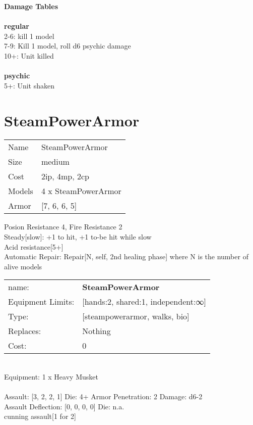 {\bf Damage Tables} \\
\ \\ {\bf regular } \\
2-6: kill 1 model \\
7-9: Kill 1 model, roll d6 psychic damage \\
10+: Unit killed \\
\ \\ {\bf psychic } \\
5+: Unit shaken \\










\pagebreak\pagebreak

\section{ SteamPowerArmor }

\begin{tabular}{ll}
  Name & SteamPowerArmor \\
  Size & medium\\
  Cost & 2ip, 4mp, 2cp\\
  Models & 4 x SteamPowerArmor\\
  Armor & [7, 6, 6, 5]\\
\end{tabular}

\noindent Posion Resistance 4, Fire Resistance 2\\ 
Steady[slow]: +1 to hit, +1 to-be hit while slow\\ 
Acid resistance[5+]\\ 
Automatic Repair: Repair[N, self, 2nd healing phase] where N is the number of alive models\\ 


\noindent
\begin{tabular}{ll}
name: &{\bf SteamPowerArmor } \\
Equipment Limits: &[hands:2, shared:1, independent:∞] \\
Type: &[steampowerarmor, walks, bio] \\
Replaces: &Nothing \\
Cost: & 0\\
\end{tabular}
\ \\
Equipment: 1 x Heavy Musket \\
\ \\
Assault: [3, 2, 2, 1] Die: 4+ Armor Penetration: 2 Damage: d6-2 \\
Assault Deflection: [0, 0, 0, 0] Die: n.a.\\
\indent cunning assault[1 for 2]\\ 
 
